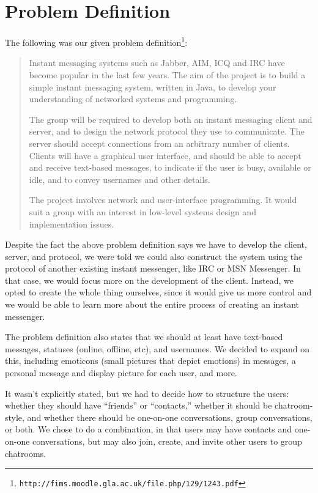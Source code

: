 \section{Problem Definition}
The following was our given problem definition\footnote{\texttt{http://fims.moodle.gla.ac.uk/file.php/129/1243.pdf}}:

\begin{quote}
Instant messaging systems such as Jabber, AIM, ICQ and IRC have become popular in the last few years. The aim of the project is to build a simple instant messaging system, written in Java, to develop your understanding of networked systems and programming.

The group will be required to develop both an instant messaging client and server, and to design the network protocol they use to communicate. The server should accept connections from an arbitrary number of clients. Clients will have a graphical user interface, and should be able to accept and receive text-based messages, to indicate if the user is busy, available or idle, and to convey usernames and other details.

The project involves network and user-interface programming. It would suit a group with an interest in low-level systems design and implementation issues.
\end{quote}

Despite the fact the above problem definition says we have to develop the client, server, and protocol, we were told we could also construct the system using the protocol of another existing instant messenger, like IRC or MSN Messenger. In that case, we would focus more on the development of the client. Instead, we opted to create the whole thing ourselves, since it would give us more control and we would be able to learn more about the entire process of creating an instant messenger.

The problem definition also states that we should at least have text-based messages, statuses (online, offline, etc), and usernames. We decided to expand on this, including emoticons (small pictures that depict emotions) in messages, a personal message and display picture for each user, and more.

It wasn't explicitly stated, but we had to decide how to structure the users: whether they should have ``friends'' or ``contacts,'' whether it should be chatroom-style, and whether there should be one-on-one conversations, group conversations, or both. We chose to do a combination, in that users may have contacts and one-on-one conversations, but may also join, create, and invite other users to group chatrooms.


